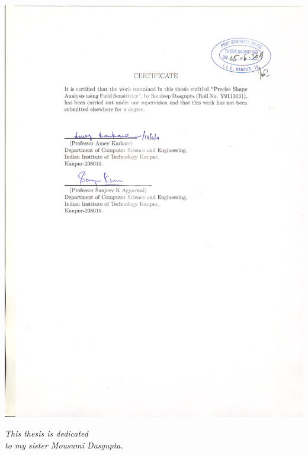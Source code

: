 \documentclass[12pt,twoside,openright]{report}
\begin{document}
%
%
%
\pagebreak
\thispagestyle{empty}
\includegraphics[width=\textwidth]{Figure/dsand.eps}
 
\newpage
\begin{center}
\thispagestyle{empty}
\vspace*{2in}
{\it This thesis is dedicated\\
to my sister Mousumi Dasgupta.}
\end{center}

%
\thispagestyle{empty}

%
\tableofcontents
\listoffigures
\listoftables
\newpage













\end{document}
